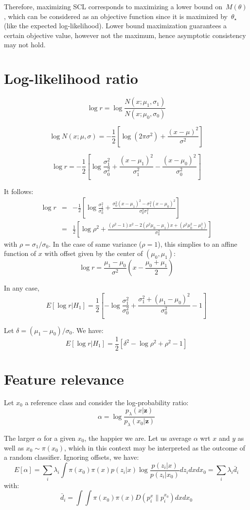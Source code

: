 \documentclass[english]{scrartcl}
\def\y{{\mathbf{y}}}
\def\y{{\mathbf{z}}}
\begin{document}
Therefore, maximizing SCL corresponds to maximizing a lower bound on~$M(\theta)$, which can be considered as an objective function since it is maximized by~$\theta_\star$ (like the expected log-likelihood). Lower bound maximization guarantees a certain objective value, however not the maximum, hence asymptotic consistency may not hold.

\section{Log-likelihood ratio}

$$
\log r = \log \frac{N(x;\mu_1,\sigma_1)}{N(x;\mu_0,\sigma_0)}
$$

$$
\log N(x;\mu,\sigma) = -\frac{1}{2}\left[
\log(2\pi\sigma^2) + \frac{(x-\mu)^2}{\sigma^2}
\right]
$$

$$
\log r = -\frac{1}{2}
\left[
\log \frac{\sigma_1^2}{\sigma_0^2}
+ \frac{(x-\mu_1)^2}{\sigma_1^2} - \frac{(x-\mu_0)^2}{\sigma_0^2}
\right]
$$

It follows:
\begin{eqnarray*}
\log r 
 & = & 
-\frac{1}{2}\left[
\log \frac{\sigma_1^2}{\sigma_0^2}
+ \frac{\sigma_0^2(x-\mu_1)^2 - \sigma_1^2(x-\mu_0)^2}{\sigma_0^2 \sigma_1^2}
\right] \\
 & = & 
\frac{1}{2}\left[
\log \rho^2
+ \frac{(\rho^2-1)x^2 - 2(\rho^2\mu_0-\mu_1)x+ (\rho^2\mu_0 ^2-\mu_1^2)}{\sigma_0^2}
\right]
\end{eqnarray*}
with $\rho=\sigma_1/\sigma_0$. In the case of same variance ($\rho=1$), this simplies to an affine function of $x$ with offset given by the center of $(\mu_0,\mu_1)$:
$$
\log r = \frac{\mu_1-\mu_0}{\sigma^2} \left(
x - \frac{\mu_0 + \mu_1}{2}
\right) 
$$

In any case,
$$
E[\log r | H_1] = 
\frac{1}{2}
\left[
- \log \frac{\sigma_1^2}{\sigma_0^2}
+ \frac{\sigma_1^2 + (\mu_1-\mu_0)^2}{\sigma_0^2}
- 1
\right]
$$

Let $\delta = (\mu_1-\mu_0)/\sigma_0$. We have:
$$
E[\log r | H_1] = 
\frac{1}{2}
\left[
\delta^2
- \log \rho^2
+ \rho^2  - 1
\right]
$$


\section{Feature relevance}

Let $x_0$ a reference class and consider the log-probability ratio:
$$
\alpha = \log \frac{p_\lambda(x|\y)}{p_\lambda(x_0|\y)}
$$

The larger $\alpha$ for a given $x_0$, the happier we are. Let us average $\alpha$ wrt $x$ and $y$ as well as $x_0\sim \pi(x_0)$, which in this context may be interpreted as the outcome of a random classifier. Ignoring offsets, we have:
$$
E[\alpha]
= \sum_i \lambda_i \int \pi(x_0)\pi(x) p(z_i|x) \log\frac{p(z_i|x)}{p(z_i|x_0)} dz_i dx dx_0
= \sum_i \lambda_i \bar{d}_i
$$
with:
$$
\bar{d}_i =
\int \int \pi(x_0) \pi(x) D(p_i^x\|p_i^{x_0}) dx dx_0
$$
\end{document}
